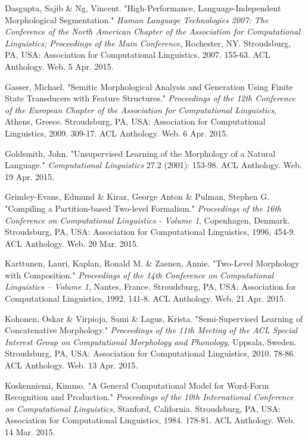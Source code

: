 \documentclass[12pt]{article}
\begin{document}
\begin{thebibliography}{9}

Dasgupta, Sajib \& Ng, Vincent.
"High-Performance, Language-Independent Morphological Segmentation."
\textit{Human Language Technologies 2007: The Conference of the North American Chapter of the Association for Computational Linguistics; Proceedings of the Main Conference},
Rochester, NY.
Stroudsburg, PA, USA:
Association for Computational Linguistics, 2007.
155-63.
ACL Anthology.
Web.
5 Apr. 2015.

Gasser, Michael.
"Semitic Morphological Analysis and Generation Using Finite State Transducers with Feature Structures."
\textit{Proceedings of the 12th Conference of the European Chapter of the Association for Computational Linguistics},
Athens, Greece.
Stroudsburg, PA, USA:
Association for Computational Linguistics, 2009.
309-17.
ACL Anthology.
Web.
6 Apr. 2015.

Goldsmith, John.
"Unsupervised Learning of the Morphology of a Natural Language."
\textit{Computational Linguistics} 27.2 (2001):
153-98.
ACL Anthology.
Web.
19 Apr. 2015.

Grimley-Evans, Edmund \& Kiraz, George Anton \& Pulman, Stephen G.
"Compiling a Partition-based Two-level Formalism."
\textit{Proceedings of the 16th Conference on Computational Linguistics - Volume 1},
Copenhagen, Denmark.
Stroudsburg, PA, USA:
Association for Computational Linguistics, 1996.
454-9.
ACL Anthology.
Web.
20 Mar. 2015.

Karttunen, Lauri, Kaplan, Ronald M. \& Zaenen, Annie.
"Two-Level Morphology with Composition."
\textit{Proceedings of the 14th Conference on Computational Linguistics -- Volume 1},
Nantes, France.
Stroudsburg, PA, USA:
Association for Computational Linguistics, 1992.
141-8.
ACL Anthology.
Web.
21 Apr. 2015.

Kohonen, Oskar \& Virpioja, Sami \& Lagus, Krista.
"Semi-Supervised Learning of Concatenative Morphology."
\textit{Proceedings of the 11th Meeting of the ACL Special Interest Group on Computational Morphology and Phonology},
Uppsala, Sweden.
Stroudsburg, PA, USA:
Association for Computational Linguistics, 2010.
78-86.
ACL Anthology.
Web.
13 Apr. 2015.

Koskenniemi, Kimmo.
"A General Computational Model for Word-Form Recognition and Production."
\textit{Proceedings of the 10th International Conference on Computational Linguistics},
Stanford, California.
Stroudsburg, PA, USA:
Association for Computational Linguistics, 1984.
178-81.
ACL Anthology.
Web.
14 Mar. 2015.


\end{thebibliography}
\end{document}
